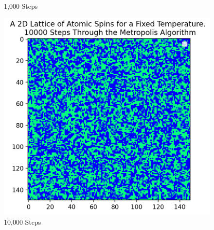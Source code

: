 \documentclass[a4paper]{article}
\begin{document}
\begin{figure}[!htb]
  \caption{1,000 Steps}\label{fig:100steps}
\endminipage\hfill
{}%
  \includegraphics[width=\linewidth]{10,000 steps.png}
  \caption{10,000 Steps}\label{fig:1000steps}
\endminipage
\end{figure}
\end{document}
